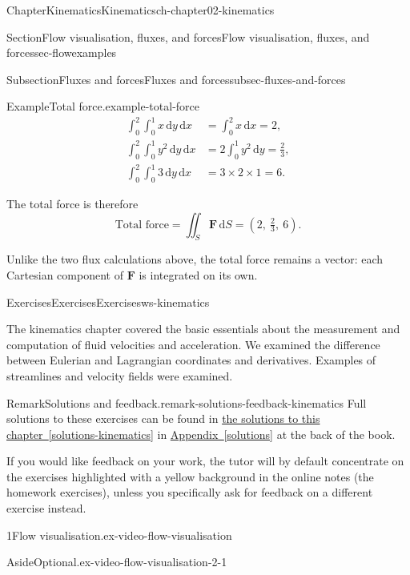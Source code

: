 \documentclass[oneside,10pt,]{book}
\newcommand{\xreffont}{\relax}
\numberwithin{equation}{section}
\newcommand{\de}{\mathrm{d}}
\newcommand{\bF}{\boldsymbol{F}}
\newcommand{\amp}{&}
\begin{document}
\begin{chapterptx}{Chapter}{Kinematics}{}{Kinematics}{}{}{ch-chapter02-kinematics}
\begin{sectionptx}{Section}{Flow visualisation, fluxes, and forces}{}{Flow visualisation, fluxes, and forces}{}{}{sec-flowexamples}
\begin{subsectionptx}{Subsection}{Fluxes and forces}{}{Fluxes and forces}{}{}{subsec-fluxes-and-forces}
\begin{example}{Example}{Total force.}{example-total-force}
\begin{align*}
\int_0^2\int_0^1 x\,\de{y}\,\de{x} \amp= \int_0^2 x\,\de{x} = 2,\\
\int_0^2\int_0^1 y^2\,\de{y}\,\de{x} \amp= 2\int_0^1 y^2\,\de{y} = \frac{2}{3},\\
\int_0^2\int_0^1 3\,\de{y}\,\de{x} \amp= 3\times 2\times 1 = 6.
\end{align*}
%
\par
The total force is therefore%
\begin{equation*}
\textrm{Total force} = \iint_S \bF\,\de{S} = \left(2,\ \tfrac{2}{3},\ 6\right).
\end{equation*}
%
\par
Unlike the two flux calculations above, the total force remains a vector: each Cartesian component of \(\bF\) is integrated on its own.%
\end{example}
\end{subsectionptx}
\end{sectionptx}
%
%
\typeout{************************************************}
\typeout{************************************************}
%
\begin{exercises-section}{Exercises}{Exercises}{}{Exercises}{}{}{ws-kinematics}
\begin{introduction}{}%
The kinematics chapter covered the basic essentials about the measurement and computation of fluid velocities and acceleration. We examined the difference between Eulerian and Lagrangian coordinates and derivatives. Examples of streamlines and velocity fields were examined.%
\begin{remark}{Remark}{Solutions and feedback.}{remark-solutions-feedback-kinematics}%
Full solutions to these exercises can be found in \hyperref[solutions-kinematics]{the solutions to this chapter~{\xreffont\ref{solutions-kinematics}}} in \hyperref[solutions]{Appendix~{\xreffont\ref{solutions}}} at the back of the book.%
\par
If you would like feedback on your work, the tutor will by default concentrate on the exercises highlighted with a yellow background in the online notes (the homework exercises), unless you specifically ask for feedback on a different exercise instead.%
\end{remark}
\end{introduction}%
\begin{divisionexercise}{1}{Flow visualisation.}{}{ex-video-flow-visualisation}%
\begin{aside}{Aside}{Optional.}{ex-video-flow-visualisation-2-1}%

\end{aside}
\end{divisionexercise}
\end{exercises-section}
\end{chapterptx}
\end{document}
